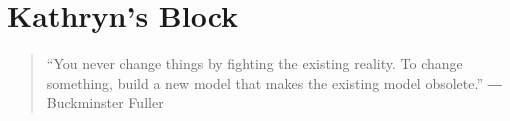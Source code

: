 \section{Kathryn's Block}
\begin{quote}
“You never change things by fighting the existing reality.
To change something, build a new model that makes the existing model obsolete.” 
― Buckminster Fuller
\end{quote}
